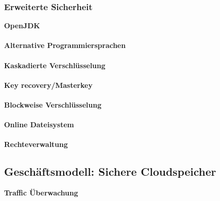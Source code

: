 \documentclass[12pt,a4paper,bibliography=totocnumbered,listof=totocnumbered]{scrartcl}
\begin{document}
\subsubsection{Erweiterte Sicherheit}
\textbf{OpenJDK}\\
\\\textbf{Alternative Programmiersprachen}\\
\\\textbf{Kaskadierte Verschlüsselung}\\
\\\textbf{Key recovery/Masterkey}\\
\\\textbf{Blockweise Verschlüsselung}\\
\\\textbf{Online Dateisystem}\\
\\\textbf{Rechteverwaltung}\\

\subsection{Geschäftsmodell: Sichere Cloudspeicher}
\textbf{Traffic Überwachung}\\
\pagebreak


	
 
\end{document}
